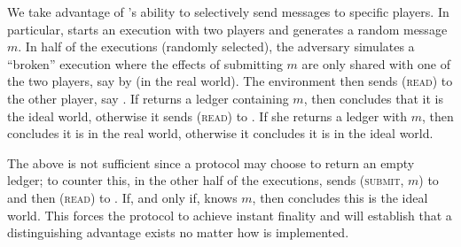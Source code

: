   \begin{proofsketch}
    We take advantage of \redden{\perfectadv}'s ability to selectively send
    messages to specific players. In particular, \redden{\perfectenv{}} starts
    an execution with two players and generates a random message $m$. In half of
    the executions (randomly selected),  the adversary simulates a ``broken''
    \perfectprot{} execution where the effects of submitting $m$ are only shared
    with one of the two players, say \alice{} by \redden{\perfectadv{}} (in the
    real world). The environment then sends (\textsc{read}) to the other player,
    say \bob. If \bob{} returns a ledger containing $m$, then
    \redden{\perfectenv{}} concludes that it is the ideal world, otherwise it
    sends (\textsc{read}) to \alice. If she returns a ledger with $m$, then
    \redden{\perfectenv{}} concludes it is in the real world, otherwise it
    concludes it is in the ideal world.

    The above is not sufficient since a protocol may choose to return an empty
    ledger; to counter this, in the other half of the executions,
    \redden{\perfectenv{}} sends (\textsc{submit}, $m$) to \alice{} and then
    (\textsc{read}) to \bob. If, and only if, \bob{} knows $m$, then
    \redden{\perfectenv{}} concludes this is the ideal world. This forces the
    \perfectprot{} protocol to achieve instant finality and will establish that
    a distinguishing advantage exists no matter how \perfectprot{} is
    implemented.
  \end{proofsketch}

